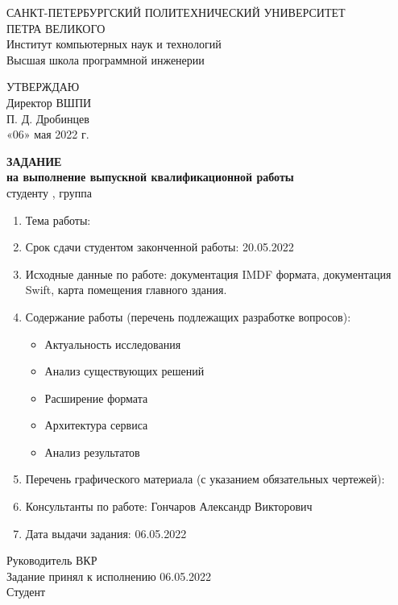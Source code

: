 \begin{center}
  {САНКТ-ПЕТЕРБУРГСКИЙ ПОЛИТЕХНИЧЕСКИЙ УНИВЕРСИТЕТ\\ ПЕТРА ВЕЛИКОГО} \\
  {Институт компьютерных наук и технологий} \\
  {Высшая школа программной инженерии} \\

  {
  \begin{flushright}
    УТВЕРЖДАЮ\\
    Директор ВШПИ\\
    \underline{\hspace{2.2cm}} П. Д. Дробинцев\\
    «06» мая 2022 г.\\[1.8cm]
  \end{flushright}
  }

  \textbf{ЗАДАНИЕ} \\
  \textbf{на выполнение выпускной квалификационной работы}\\
  студенту \AuthorFull, группа \Group \\[0.5cm]
  \begin{enumerate}[label=\arabic*.]
    \item Тема работы: \Theme
    \item Срок сдачи студентом законченной работы: 20.05.2022
    \item Исходные данные по работе: документация IMDF формата, документация Swift, карта помещения главного здания.
    \item Содержание работы (перечень подлежащих разработке вопросов):
      \begin{itemize}
        \item Актуальность исследования
        \item Анализ существующих решений
        \item Расширение формата
        \item Архитектура сервиса
        \item Анализ результатов
      \end{itemize}
    \item Перечень графического материала (с указанием обязательных чертежей):
    \item Консультанты по работе: Гончаров Александр Викторович
    \item Дата выдачи задания: 06.05.2022
  \end{enumerate}
\end{center}
Руководитель ВКР \hspace{3.5cm} \underline{\hspace{5cm}} \hfill \Supervisor\\[0.5cm]
Задание принял к исполнению 06.05.2022\\[0.5cm]
Студент \hspace{5.8cm} \underline{\hspace{5cm}} \hfill \Author\\
